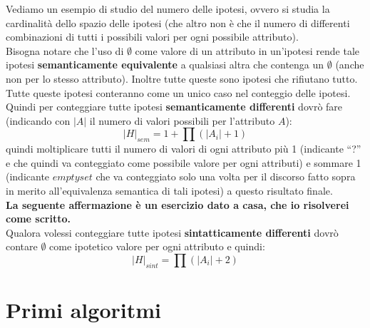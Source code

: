 \begin{esempio}
  Vediamo un esempio di studio del numero delle ipotesi, ovvero si studia la
  cardinalità dello spazio delle ipotesi (che altro non è che il numero di
  differenti combinazioni di tutti i possibili valori per ogni possibile
  attributo).\\
  Bisogna notare che l'uso di $\emptyset$ come valore di un attributo in
  un'ipotesi rende tale ipotesi \textbf{semanticamente equivalente} a qualsiasi
  altra che contenga un $\emptyset$ (anche non per lo stesso attributo). Inoltre
  tutte queste sono ipotesi che rifiutano tutto. Tutte queste ipotesi conteranno
  come un unico caso nel conteggio delle ipotesi.\\
  Quindi per conteggiare tutte ipotesi \textbf{semanticamente differenti} dovrò
  fare (indicando con $|A|$ il numero di valori possibili per l'attributo $A$):
  \[|H|_{sem}=1+\prod (|A_i|+1)\]
  quindi moltiplicare tutti il numero di valori di ogni attributo più 1
  (indicante ``?'' e che quindi va conteggiato come possibile valore per ogni
  attributi) e sommare 1 (indicante $emptyset$ che va conteggiato solo una volta
  per il discorso fatto sopra in merito all'equivalenza semantica di tali
  ipotesi) a questo risultato finale.\\
  \textbf{La seguente affermazione è un esercizio dato a casa, che io risolverei
  come scritto.}\\
  Qualora volessi conteggiare tutte ipotesi \textbf{sintatticamente differenti}
  dovrò contare $\emptyset$ come ipotetico valore per ogni attributo e quindi:
  \[|H|_{sint}=\prod (|A_i|+2)\]
\end{esempio}
\newpage
\section{Primi algoritmi}
